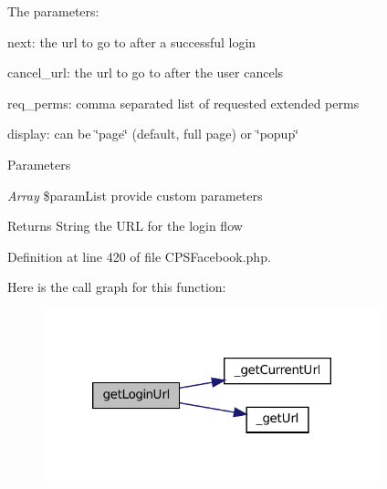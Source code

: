 The parameters:
\begin{DoxyItemize}
\item next: the url to go to after a successful login
\item cancel\_\-url: the url to go to after the user cancels
\item req\_\-perms: comma separated list of requested extended perms
\item display: can be \char`\"{}page\char`\"{} (default, full page) or \char`\"{}popup\char`\"{}
\end{DoxyItemize}


\begin{DoxyParams}{Parameters}
\item[{\em Array}]\$paramList provide custom parameters \end{DoxyParams}
\begin{DoxyReturn}{Returns}
String the URL for the login flow 
\end{DoxyReturn}


Definition at line 420 of file CPSFacebook.php.








Here is the call graph for this function:\nopagebreak
\begin{figure}[H]
\begin{center}
\leavevmode
\includegraphics[width=276pt]{classCPSFacebook_a3fc2a3b447d666e9f8607da999a1ea2d_cgraph}
\end{center}
\end{figure}


